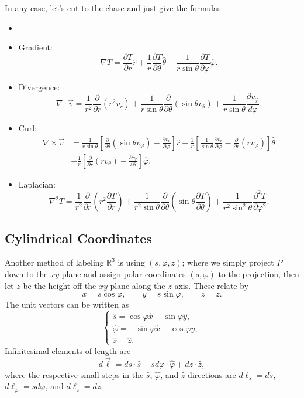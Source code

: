 In any case, let's cut to the chase and just give the formulas:

\begin{proposition}
    \begin{itemize}
        \item[]
        \item Gradient:
        \[\nabla T=\frac{\partial T}{\partial r}\hat{r}+\frac{1}{r}\frac{\partial T}{\partial\theta}\hat{\theta}+\frac{1}{r\sin\theta}\frac{\partial T}{\partial\varphi}\hat{\varphi}.\]
        \item Divergence:
        \[\nabla\cdot\vec{v}=\frac{1}{r^2}\frac{\partial}{\partial r}(r^2v_r)+\frac{1}{r\sin\theta}\frac{\partial}{\partial\theta}(\sin\theta v_\theta)+\frac{1}{r\sin\theta}\frac{\partial v_\varphi}{d\varphi}.\]
        \item Curl:
        \begin{align*}
            \nabla\times\vec{v}&=\frac{1}{r\sin\theta}\left[\frac{\partial}{\partial\theta}(\sin\theta v_\varphi)-\frac{\partial v_\theta}{\partial \varphi}\right]\hat{r}+\frac{1}{r}\left[\frac{1}{\sin\theta} \frac{\partial v_r}{\partial \varphi}-\frac{\partial}{\partial r}(rv_\varphi)\right]\hat{\theta}\\
            &+\frac{1}{r}\left[\frac{\partial}{\partial r}(rv_\theta)-\frac{\partial v_r}{\partial \theta}\right]\hat{\varphi}.
        \end{align*}
        \item Laplacian:
        \[\nabla^2 T=\frac{1}{r^2}\frac{\partial}{\partial r}\left(r^2\frac{\partial T}{\partial r}\right)+\frac{1}{r^2\sin\theta}\frac{\partial}{\partial \theta}\left(\sin\theta\frac{\partial T}{\partial \theta}\right)+\frac{1}{r^2\sin^2\theta}\frac{\partial^2T}{\partial \varphi^2}.\]
    \end{itemize}
\end{proposition}

\subsection{Cylindrical Coordinates}

Another method of labeling $\mathbb{R}^3$ is using  $(s,\varphi,z)$; where we simply project $P$ down to the $xy$-plane and assign polar coordinates $(s,\varphi)$ to the projection, then let $z$ be the height off the $xy$-plane along the $z$-axis. These relate by
\[x=s\cos\varphi,\qquad y=s\sin\varphi, \qquad z=z.\]
The unit vectors can be written as
\[\begin{cases}
\hat{s}= \cos\varphi\hat{x}+\sin\varphi\hat{y},\\
\hat{\varphi}=-\sin\varphi\hat{x}+\cos\varphi\hat{y},\\
\hat{z}=\hat{z}.
\end{cases}\]
Infinitesimal elements of length are
\[d\vec{\ell}=ds\cdot\hat{s}+sd\varphi\cdot \hat{\varphi}+dz\cdot\hat{z},\]
where the respective small steps in the $\hat{s}$, $\hat{\varphi}$, and $\hat{z}$ directions are $d\ell_s=ds$, $d\ell_\varphi=sd\varphi$, and $d\ell_z=dz$.

